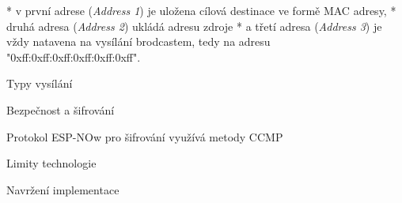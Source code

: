 \begitems
* v první adrese ({\em Address 1}) je uložena cílová destinace ve formě MAC adresy,
* druhá adresa ({\em Address 2}) ukládá adresu zdroje
* a třetí adresa ({\em Address 3}) je vždy natavena na vysílání brodcastem, tedy na adresu "0xff:0xff:0xff:0xff:0xff:0xff".
\enditems

\secc Typy vysílání

\secc Bezpečnost a šifrování

Protokol ESP-NOw pro šifrování využívá metody CCMP

\secc Limity technologie

\sec Navržení implementace
